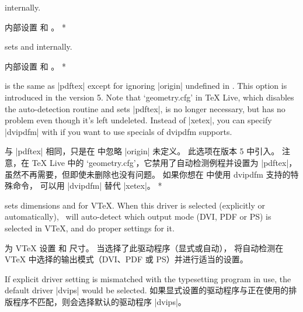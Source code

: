 \begin{Options}
\begin{paracol}{2}
     internally.
\switchcolumn\item[\onlypre pdftex] 内部设置  和 。
\switchcolumn[0]*\item[\onlypre luatex] sets  and  internally.
\switchcolumn\item[\onlypre luatex] 内部设置  和 。
\switchcolumn[0]*\item[\onlypre xetex] is the same as |pdftex| except for ignoring
    |origin| undefined in \XeLaTeX{}. This option is introduced in
    the version 5. Note that `geometry.cfg' in \TeX{} Live, which disables the
    auto-detection routine and sets |pdftex|, is no longer necessary,
    but has no problem even though it's left undeleted.
    Instead of |xetex|, you can specify |dvipdfm| with \XeLaTeX{}
    if you want to use specials of dvipdfm \XeTeX{} supports.
\switchcolumn\item[\onlypre xetex] 与 |pdftex| 相同，只是在 \XeLaTeX{} 中忽略 |origin| 未定义。
此选项在版本 5 中引入。
注意，在 \TeX{} Live 中的 `geometry.cfg'，它禁用了自动检测例程并设置为 |pdftex|，
虽然不再需要，但即使未删除也没有问题。
如果你想在 \XeLaTeX{} 中使用 dvipdfm \XeTeX{} 支持的特殊命令，
可以用 |dvipdfm| 替代 |xetex|。
\switchcolumn[0]*\item[\onlypre vtex] sets dimensions  and 
    for V\TeX. When this driver is selected (explicitly or
    automatically), \Gm\ will auto-detect which output mode
    (DVI, PDF or PS) is selected in V\TeX, and do proper
    settings for it.
\switchcolumn\item[\onlypre vtex] 为 V\TeX{} 设置  和  尺寸。
当选择了此驱动程序（显式或自动），\Gm{} 将自动检测在 V\TeX{} 中选择的输出模式（DVI、PDF 或 PS）并进行适当的设置。
\end{paracol}
\end{Options}

\begin{paracol}{2}
    If explicit driver setting is mismatched with the typesetting program
    in use, the default driver |dvips| would be selected.
    \switchcolumn 如果显式设置的驱动程序与正在使用的排版程序不匹配，则会选择默认的驱动程序 |dvips|。
\end{paracol}
